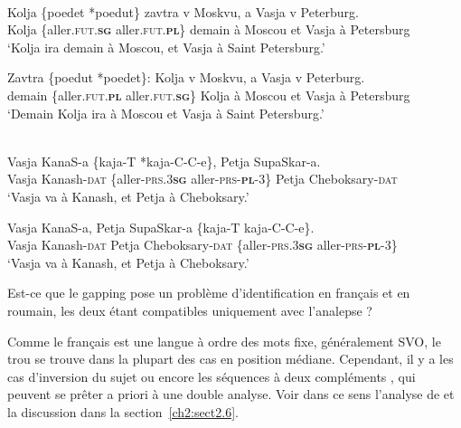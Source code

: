 \ea
{}\\
\ea 
\gll Kolja  \{poedet {\textbar} *poedut\}  zavtra  v  Moskvu,  a  Vasja  v  Peterburg. \label{ch2:ex18a}\\
Kolja  \{aller.\textsc{fut.}\textbf{\textsc{sg}} {\textbar} aller.\textsc{fut.}\textbf{\textsc{pl}}\}  demain  à  Moscou  et  Vasja  à  Petersburg\\
\glt ‘Kolja ira demain à Moscou, et Vasja à Saint Petersburg.’

\ex 
\gll Zavtra  \{poedut {\textbar} *poedet\}: Kolja  v  Moskvu,  a  Vasja  v  Peterburg. \label{ch2:ex18b}\\
demain \{aller.\textsc{fut.}\textbf{\textsc{pl}} {\textbar} aller.\textsc{fut.}\textbf{\textsc{sg}}\}  Kolja  à  Moscou  et  Vasja  à  Petersburg\\
\glt ‘Demain Kolja ira à Moscou et Vasja à Saint Petersburg.’  
\z
\z

\ea
{}\\
\ea 
\gll Vasja  KanaS-a  \{kaja-T {\textbar} *kaja-C-C-e\},  Petja  SupaSkar-a. \label{ch2:ex19a}\\
Vasja  Kanash-\textsc{dat} \{aller-\textsc{prs.3}\textbf{\textsc{sg}} {\textbar} aller-\textsc{prs-}\textbf{\textsc{pl}}-3\} Petja  Cheboksary-\textsc{dat}\\
\glt ‘Vasja va à Kanash, et Petja à Cheboksary.’

\ex
\gll Vasja  KanaS-a,  Petja  SupaSkar-a  \{kaja-T {\textbar} kaja-C-C-e\}. \label{ch2:ex19b}\\
Vasja  Kanash-\textsc{dat}  Petja  Cheboksary-\textsc{dat} \{aller-\textsc{prs.3}\textbf{\textsc{sg}} {\textbar} aller-\textsc{prs-}\textbf{\textsc{pl}}-3\}\\
\glt ‘Vasja va à Kanash, et Petja à Cheboksary.’ 
\z
\z

Est-ce que le gapping pose un problème d’identification en français et en rou\-main, les deux étant compatibles uniquement avec l’analepse ?

\newpage 
Comme le français est une langue à ordre des mots fixe, {\cad} généralement SVO, le trou se trouve dans la plupart des cas en position médiane. Cependant, il y a les cas d’inversion du sujet  ou encore les séquences à deux compléments , qui peuvent se prêter a priori à une double analyse. Voir dans ce sens l’analyse de \citet{Mouret2007,Mouret2008} et la discussion dans la section~\ref{ch2:sect2.6}.

